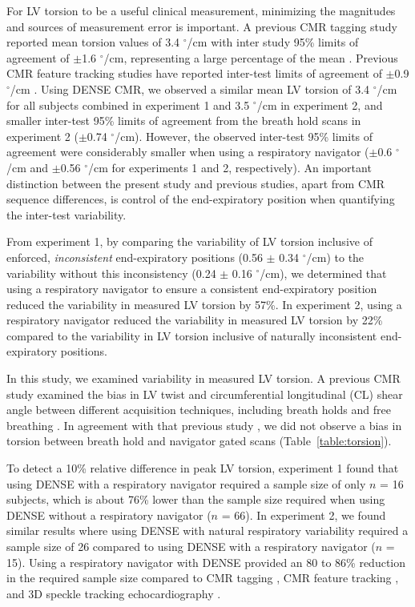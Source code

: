 	For LV torsion to be a useful clinical measurement, minimizing the magnitudes and sources of measurement error is important. A previous CMR tagging study reported mean torsion values of 3.4 $^{\circ}$/cm with inter study 95\% limits of agreement of $\pm$1.6 $^{\circ}$/cm, representing a large percentage of the mean \cite{Donekal2013a}. Previous CMR feature tracking studies have reported inter-test limits of agreement of $\pm$0.9 $^{\circ}$/cm \cite{Kowallick2016,Kowallick2014}. Using DENSE CMR, we observed a similar mean LV torsion of 3.4 $^{\circ}$/cm for all subjects combined in experiment 1 and 3.5 $^{\circ}$/cm in experiment 2, and smaller inter-test 95\% limits of agreement from the breath hold scans in experiment 2 ($\pm$0.74 $^{\circ}$/cm). However, the observed inter-test 95\% limits of agreement were considerably smaller when using a respiratory navigator ($\pm$0.6 $^{\circ}$/cm and $\pm$0.56 $^{\circ}$/cm for experiments 1 and 2, respectively). An important distinction between the present study and previous studies, apart from CMR sequence differences, is control of the end-expiratory position when quantifying the inter-test variability.
	
	From experiment 1, by comparing the variability of LV torsion inclusive of enforced, \textit{inconsistent} end-expiratory positions (0.56 $\pm$ 0.34 $^{\circ}$/cm) to the variability without this inconsistency (0.24 $\pm$ 0.16 $^{\circ}$/cm), we determined that using a respiratory navigator to ensure a consistent end-expiratory position reduced the variability in measured LV torsion by 57\%. In experiment 2, using a respiratory navigator reduced the variability in measured LV torsion by 22\% compared to the variability in LV torsion inclusive of naturally inconsistent end-expiratory positions.
	
	In this study, we examined variability in measured LV torsion. A previous CMR study examined the bias in LV twist and circumferential longitudinal (CL) shear angle between different acquisition techniques, including breath holds and free breathing \cite{Reyhan2017a}. In agreement with that previous study \cite{Reyhan2017a}, we did not observe a bias in torsion between breath hold and navigator gated scans (Table~\ref{table:torsion}).
	
	To detect a 10\% relative difference in peak LV torsion, experiment 1 found that using DENSE with a respiratory navigator required a sample size of only $n$ = 16 subjects, which is about 76\% lower than the sample size required when using DENSE without a respiratory navigator ($n$ = 66). In experiment 2, we found similar results where using DENSE with natural respiratory variability required a sample size of 26 compared to using DENSE with a respiratory navigator ($n$ = 15).  Using a respiratory navigator with DENSE provided an 80 to 86\% reduction in the required sample size compared to CMR tagging \cite{Donekal2013a}, CMR feature tracking \cite{Kowallick2016}, and 3D speckle tracking echocardiography \cite{Kaku2014a}.
	 
